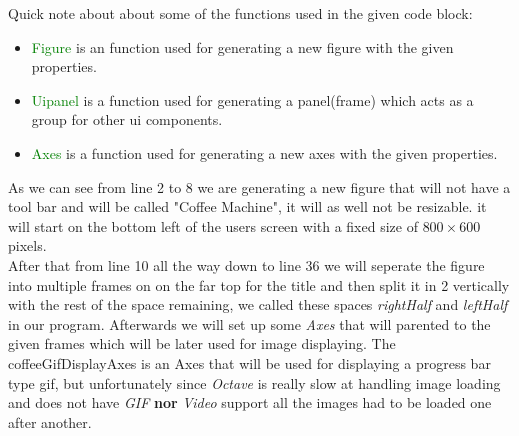 \documentclass[a4paper, 10pt]{article}
\begin{document}
		\noindent Quick note about about some of the functions used in the given code block:
		\begin{itemize}
			\item \textcolor{green}{Figure} is an function used for generating a new figure with the given properties.
			\item \textcolor{green}{Uipanel} is a function used for generating a panel(frame) which acts as a group for other ui components.
			\item \textcolor{green}{Axes} is a function used for generating a new axes with the given properties.
		\end{itemize}
		\noindent As we can see from line 2 to 8 we are generating a new figure that will not have a tool bar and will be called "Coffee Machine", it will as well not be resizable. it will start on the bottom left of the users screen with a fixed size of
		$800 \times 600$ pixels. \\

		\noindent After that from line 10 all the way down to line 36 we will seperate the figure into multiple frames on on the far top for the title and then split it in 2 vertically with the rest of the space remaining, we called these spaces
		\emph{rightHalf} and \emph{leftHalf} in our program. Afterwards we will set up some \emph{Axes} that will parented to the given frames which will be later used for image displaying. The coffeeGifDisplayAxes is an Axes that will be used for displaying a
		progress bar type gif, but unfortunately since \emph{Octave} is really slow at handling image loading and does not have \emph{GIF} \textbf{nor} \emph{Video} support all the images had to be loaded one after another.\\
\end{document}
